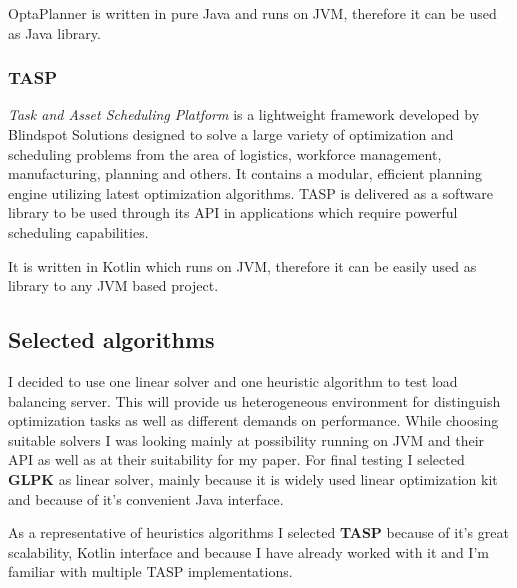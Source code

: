 OptaPlanner is written in pure Java and runs on JVM, therefore it can be used as Java library.

\subsubsection{TASP}\label{subsubsec:tasp}
\textit{Task and Asset Scheduling Platform} is a lightweight framework developed by Blindspot Solutions\cite{web:blindspot} designed to solve a large
variety of optimization and scheduling problems from the area of logistics, workforce management, manufacturing, planning and others.
It contains a modular, efficient planning engine utilizing latest optimization algorithms.
TASP is delivered as a software library to be used through its API in applications which require powerful scheduling capabilities.

It is written in Kotlin which runs on JVM, therefore it can be easily used as library to any JVM based project\@.

\subsection{Selected algorithms}\label{subsec:selected-algorithms}
I decided to use one linear solver and one heuristic algorithm to test load balancing server.
This will provide us heterogeneous environment for distinguish optimization tasks as well as different demands on performance.
While choosing suitable solvers I was looking mainly at possibility running on JVM and their API as well as at their suitability for my paper.
For final testing I selected \textbf{GLPK} as linear solver, mainly because it is widely used linear optimization kit
and because of it's convenient Java interface.

As a representative of heuristics algorithms I selected \textbf{TASP} because of it's great scalability, Kotlin interface
and because I have already worked with it and I'm familiar with multiple TASP implementations.